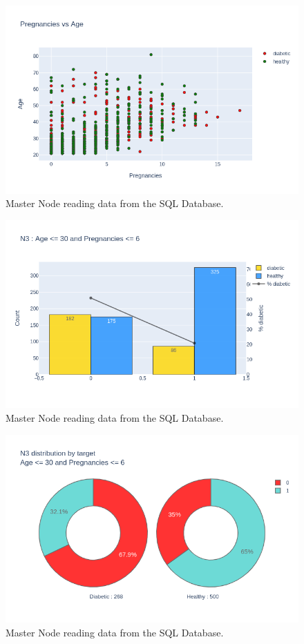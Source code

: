 \documentclass[12pt]{article}
\begin{document}
\begin{figure}[ht]
\centering
\includegraphics[width=1\textwidth]{newplot(17).png}
\caption{Master Node reading data from the SQL Database.}
\end{figure}

\begin{figure}[ht]
\centering
\includegraphics[width=1\textwidth]{newplot(18).png}
\caption{Master Node reading data from the SQL Database.}
\end{figure}

\begin{figure}[ht]
\centering
\includegraphics[width=1\textwidth]{newplot(19).png}
\caption{Master Node reading data from the SQL Database.}
\end{figure}
\end{document}
